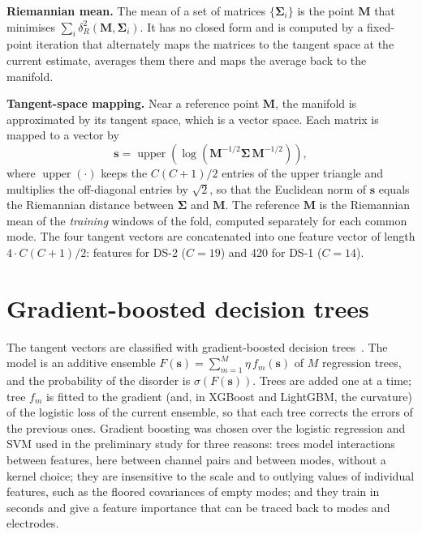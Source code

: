 \textbf{Riemannian mean.} The mean of a set of matrices $\{\boldsymbol{\Sigma}_i\}$ is the point
$\mathbf{M}$ that minimises $\sum_i \delta_R^2(\mathbf{M},\boldsymbol{\Sigma}_i)$. It has no closed
form and is computed by a fixed-point iteration that alternately maps the matrices to the tangent
space at the current estimate, averages them there and maps the average back to the manifold.

\textbf{Tangent-space mapping.} Near a reference point $\mathbf{M}$, the manifold is approximated
by its tangent space, which is a vector space. Each matrix is mapped to a vector by
\begin{equation}
\mathbf{s} = \operatorname{upper}\!\left(\log\!\left(\mathbf{M}^{-1/2}\boldsymbol{\Sigma}\,\mathbf{M}^{-1/2}\right)\right),
\label{eq:ts}
\end{equation}
where $\operatorname{upper}(\cdot)$ keeps the $C(C+1)/2$ entries of the upper triangle and
multiplies the off-diagonal entries by $\sqrt{2}$, so that the Euclidean norm of $\mathbf{s}$
equals the Riemannian distance between $\boldsymbol{\Sigma}$ and $\mathbf{M}$. The reference
$\mathbf{M}$ is the Riemannian mean of the \emph{training} windows of the fold, computed
separately for each common mode. The four tangent vectors are concatenated into one feature
vector of length $4\cdot C(C+1)/2$:  features for DS-2 ($C=19$) and 420 for DS-1
($C=14$).

\section{Gradient-boosted decision trees}
The tangent vectors are classified with gradient-boosted decision trees~\cite{chen2016, ke2017}.
The model is an additive ensemble $F(\mathbf{s})=\sum_{m=1}^{M} \eta\, f_m(\mathbf{s})$ of $M$
regression trees, and the probability of the disorder is $\sigma(F(\mathbf{s}))$. Trees are
added one at a time; tree $f_m$ is fitted to the gradient (and, in XGBoost and LightGBM, the
curvature) of the logistic loss of the current ensemble, so that each tree corrects the errors of
the previous ones. Gradient boosting was chosen over the logistic regression and SVM used in the
preliminary study for three reasons: trees model interactions between features, here between
channel pairs and between modes, without a kernel choice; they are insensitive to the scale and
to outlying values of individual features, such as the floored covariances of empty modes; and
they train in seconds and give a feature importance that can be traced back to modes and
electrodes.

